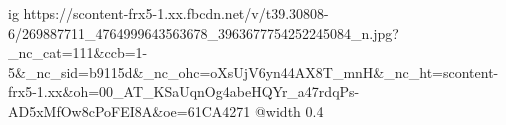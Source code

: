  
 
 
 
 

\ifcmt
  ig https://scontent-frx5-1.xx.fbcdn.net/v/t39.30808-6/269887711_4764999643563678_3963677754252245084_n.jpg?_nc_cat=111&ccb=1-5&_nc_sid=b9115d&_nc_ohc=oXsUjV6yn44AX8T_mnH&_nc_ht=scontent-frx5-1.xx&oh=00_AT_KSaUqnOg4abeHQYr_a47rdqPs-AD5xMfOw8cPoFEI8A&oe=61CA4271
  @width 0.4
\fi
